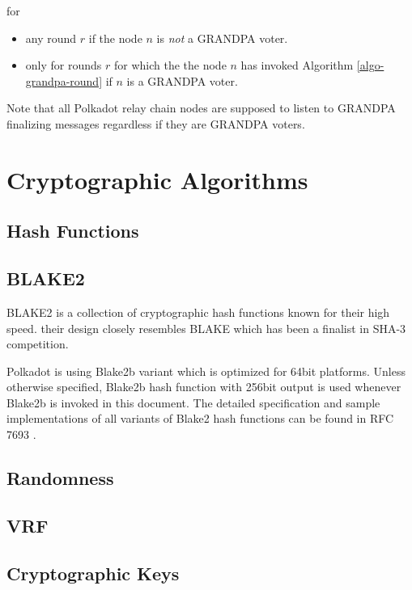 \documentclass{book}
\newcommand{\tmem}[1]{{\em #1\/}}
\newcommand{\tmtextit}[1]{{\itshape{#1}}}
\newenvironment{itemizedot}{\begin{itemize} \renewcommand{\labelitemi}{$\bullet$}\renewcommand{\labelitemii}{$\bullet$}\renewcommand{\labelitemiii}{$\bullet$}\renewcommand{\labelitemiv}{$\bullet$}}{\end{itemize}}
\providecommand{\tmem}[1]{\tmtextit{#1}}
\providecommand{\tmtextit}[1]{\tmtextit{#1}}
\begin{document}
for
\begin{itemizedot}
  \item any round $r$ if the node $n$ is {\tmem{not}} a GRANDPA voter.
  
  \item only for rounds $r$ for which the the node $n$ has invoked Algorithm
  \ref{algo-grandpa-round} if $n$ is a GRANDPA voter.
\end{itemizedot}
Note that all Polkadot relay chain nodes are supposed to listen to GRANDPA
finalizing messages regardless if they are GRANDPA
voters.\appendix\chapter{Cryptographic Algorithms}

\section{Hash Functions}\label{sect-hash-functions}

\section{BLAKE2}\label{sect-blake2}

BLAKE2 is a collection of cryptographic hash functions known for their high
speed. their design closely resembles BLAKE which has been a finalist in SHA-3
competition.

Polkadot is using Blake2b variant which is optimized for 64bit platforms.
Unless otherwise specified, Blake2b hash function with 256bit output is used
whenever Blake2b is invoked in this document. The detailed specification and
sample implementations of all variants of Blake2 hash functions can be found
in RFC 7693 {\cite{saarinen_blake2_2015}}.

\section{Randomness}\label{sect-randomness}

\section{VRF}\label{sect-vrf}

\section{Cryptographic Keys}\label{sect-cryptographic-keys}
\end{document}
